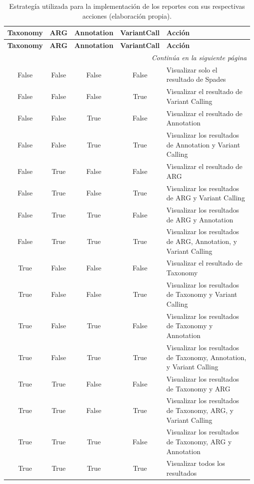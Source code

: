\documentclass[12pt]{article}
\begin{document}
\begin{longtable}{|c|c|c|c|p{6cm}|}
    \caption{Estrategía utilizada para la implementación de los reportes con sus respectivas acciones (elaboración propia).}
    \label{tabla:acciones} \\
    \hline
    \textbf{Taxonomy} & \textbf{ARG} & \textbf{Annotation} & \textbf{VariantCall} & \textbf{Acción} \\
    \hline
    \endfirsthead
    
    \hline
    \textbf{Taxonomy} & \textbf{ARG} & \textbf{Annotation} & \textbf{VariantCall} & \textbf{Acción} \\
    \hline
    \endhead
    
    \hline \multicolumn{5}{r}{\textit{Continúa en la siguiente página}} \\
    \endfoot
    
    \hline
    \endlastfoot
    
    False & False & False & False & Visualizar solo el resultado de Spades \\
    \hline
    False & False & False & True & Visualizar el resultado de Variant Calling \\
    \hline
    False & False & True & False & Visualizar el resultado de Annotation \\
    \hline
    False & False & True & True & Visualizar los resultados de Annotation y Variant Calling \\
    \hline
    False & True & False & False & Visualizar el resultado de ARG \\
    \hline
    False & True & False & True & Visualizar los resultados de ARG y Variant Calling \\
    \hline
    False & True & True & False & Visualizar los resultados de ARG y Annotation \\
    \hline
    False & True & True & True & Visualizar los resultados de ARG, Annotation, y Variant Calling \\
    \hline
    True & False & False & False & Visualizar el resultado de Taxonomy \\
    \hline
    True & False & False & True & Visualizar los resultados de Taxonomy y Variant Calling \\
    \hline
    True & False & True & False & Visualizar los resultados de Taxonomy y Annotation \\
    \hline
    True & False & True & True & Visualizar los resultados de Taxonomy, Annotation, y Variant Calling \\
    \hline
    True & True & False & False & Visualizar los resultados de Taxonomy y ARG \\
    \hline
    True & True & False & True & Visualizar los resultados de Taxonomy, ARG, y Variant Calling \\
    \hline
    True & True & True & False & Visualizar los resultados de Taxonomy, ARG y Annotation \\
    \hline
    True & True & True & True & Visualizar todos los resultados \\
    \hline
\end{longtable}
\end{document}
